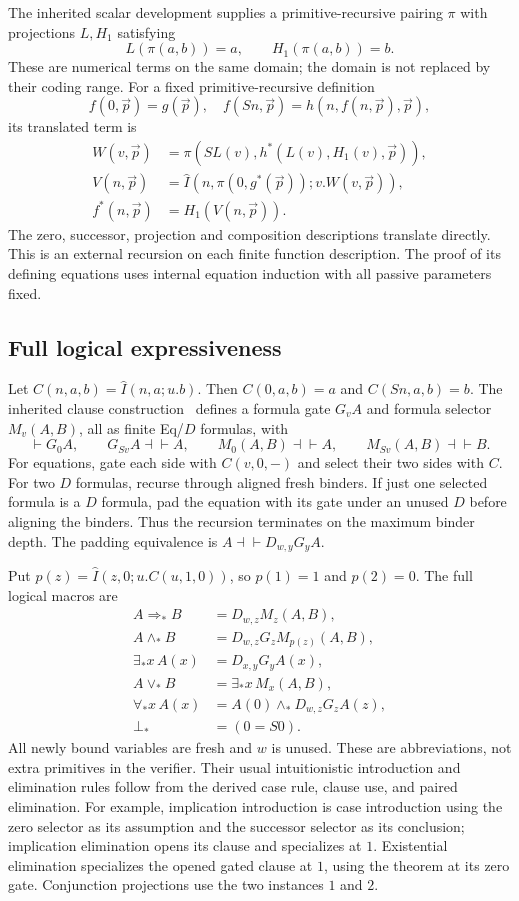 \documentclass[11pt,letterpaper]{article}
\theoremstyle{definition}\newtheorem{definition}[theorem]{Definition}
\begin{document}
The inherited scalar development supplies a primitive-recursive pairing $\pi$ with projections $L,H_1$ satisfying
\[
 L(\pi(a,b))=a,\qquad H_1(\pi(a,b))=b.
\]
These are numerical terms on the same domain; the domain is not replaced by their coding range. For a fixed primitive-recursive definition
\[
 f(0,\vec p)=g(\vec p),\quad
 f(Sn,\vec p)=h(n,f(n,\vec p),\vec p),
\]
its translated term is
\[
 \begin{split}
 W(v,\vec p)&=\pi(SL(v),h^*(L(v),H_1(v),\vec p)),\\
 V(n,\vec p)&=\widehat I(n,\pi(0,g^*(\vec p));v.W(v,\vec p)),\\
 f^*(n,\vec p)&=H_1(V(n,\vec p)).
 \end{split}
\]
The zero, successor, projection and composition descriptions translate directly. This is an external recursion on each finite function description. The proof of its defining equations uses internal equation induction with all passive parameters fixed.

\subsection{Full logical expressiveness}
Let $C(n,a,b)=\widehat I(n,a;u.b)$. Then $C(0,a,b)=a$ and $C(Sn,a,b)=b$. The inherited clause construction~\cite{clauses} defines a formula gate $G_vA$ and formula selector $M_v(A,B)$, all as finite Eq/$D$ formulas, with
\[
 \vdash G_0A,\qquad G_{Sv}A\dashv\vdash A,\qquad
 M_0(A,B)\dashv\vdash A,\qquad M_{Sv}(A,B)\dashv\vdash B.
\]
For equations, gate each side with $C(v,0,-)$ and select their two sides with $C$. For two $D$ formulas, recurse through aligned fresh binders. If just one selected formula is a $D$ formula, pad the equation with its gate under an unused $D$ before aligning the binders. Thus the recursion terminates on the maximum binder depth. The padding equivalence is $A\dashv\vdash D_{w,y}G_yA$.

Put $p(z)=\widehat I(z,0;u.C(u,1,0))$, so $p(1)=1$ and $p(2)=0$. The full logical macros are
\[
\begin{aligned}
 A\Rightarrow_*B&=D_{w,z}M_z(A,B),\\
 A\wedge_*B&=D_{w,z}G_z M_{p(z)}(A,B),\\
 \exists_*x\,A(x)&=D_{x,y}G_yA(x),\\
 A\vee_*B&=\exists_*x\,M_x(A,B),\\
 \forall_*x\,A(x)&=A(0)\wedge_*D_{w,z}G_zA(z),\\
 \bot_*&=(0=S0).
\end{aligned}
\]
All newly bound variables are fresh and $w$ is unused. These are abbreviations, not extra primitives in the verifier. Their usual intuitionistic introduction and elimination rules follow from the derived case rule, clause use, and paired elimination. For example, implication introduction is case introduction using the zero selector as its assumption and the successor selector as its conclusion; implication elimination opens its clause and specializes at $1$. Existential elimination specializes the opened gated clause at $1$, using the theorem at its zero gate. Conjunction projections use the two instances $1$ and $2$.
\end{document}
